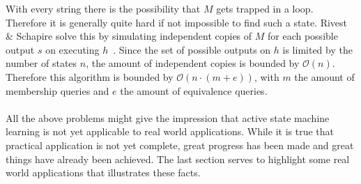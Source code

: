 With every string there is the possibility that $M$ gets trapped in a loop.
Therefore it is generally quite hard if not impossible to find such a state.
Rivest \& Schapire solve this by simulating independent copies of $M$ for each
possible output $s$ on executing $h$~\cite[p. 313]{Rivest1993}.  Since the set
of possible outputs on $h$ is limited by the number of states $n$, the amount of
independent copies is bounded by $\mathcal{O}(n)$.  Therefore this algorithm is
bounded by $\mathcal{O}(n \cdot (m + e))$, with $m$ the amount of membership
queries and $e$ the amount of equivalence queries.
\\
\\
All the above problems might give the impression that active state machine
learning is not yet applicable to real world applications. While it is true that
practical application is not yet complete, great progress has been made and
great things have already been achieved. The last section serves to highlight
some real world applications that illustrates these facts.

